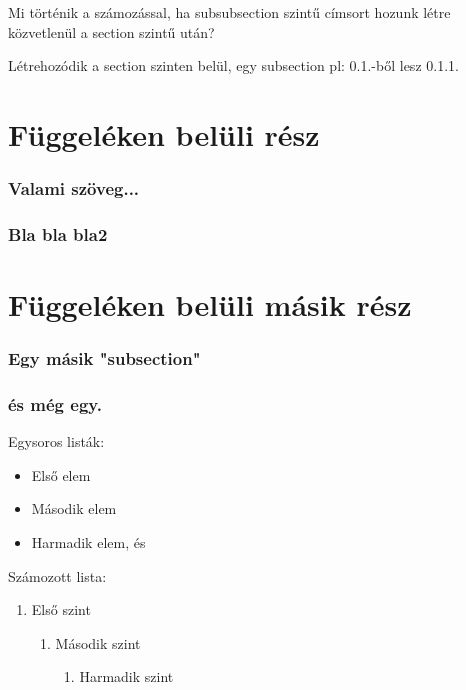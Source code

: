 \documentclass[12pt]{book}
\begin{document}
{
Mi történik a számozással, ha subsubsection szintű címsort hozunk létre
közvetlenül a section szintű után? \par
Létrehozódik a section szinten belül, egy subsection pl: 0.1.-ből lesz 0.1.1.
}

\appendix  %
\label{chap:appendix}
\chapter{Függeléken belüli rész}
\subsection{Valami szöveg...}
\subsection{Bla bla bla2}

\chapter{Függeléken belüli másik rész}
\subsection{Egy másik "subsection"}
\subsection{és még egy.}

Egysoros listák:
\begin{itemize}[label=\# , before=\hspace{0pt}, after=\hspace{0pt}]
    \item Első elem \label{item:elsoelem}
    \item Második elem
    \item Harmadik elem, és
\end{itemize}

Számozott lista:
\begin{enumerate}
    \item Első szint
    \begin{enumerate}
        \renewcommand{\labelenumi}{\alph{enumi}.}  %
        \item Második szint \label{enim:masodikelem}
        \begin{enumerate}
            \item Harmadik szint
        \end{enumerate}
    \end{enumerate}
\end{enumerate}
\end{document}
